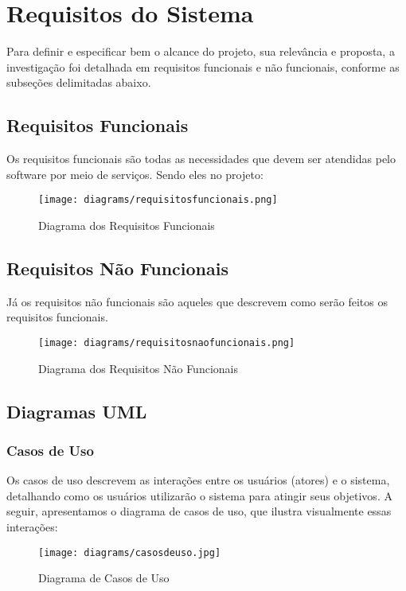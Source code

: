 \documentclass[../main.tex]{subfiles}
\begin{document}
\section{Requisitos do Sistema}
Para definir e especificar bem o alcance do projeto, sua relevância e proposta, a investigação foi detalhada em requisitos funcionais e não funcionais, conforme as subseções delimitadas abaixo. 
\subsection{Requisitos Funcionais}
Os requisitos funcionais são todas as necessidades que devem ser atendidas pelo software por meio de serviços. Sendo eles no projeto: 
\vspace{3cm}
\begin{figure}[htbp]
    \centering
    \texttt{[image: diagrams/requisitosfuncionais.png]}
    \caption{Diagrama dos Requisitos Funcionais}
    \label{fig:requisitos-funcionais}
\end{figure}
\subsection{Requisitos Não Funcionais}
Já os requisitos não funcionais são aqueles que descrevem como serão feitos os requisitos funcionais.
\vspace{3cm}
\begin{figure}[htbp]
    \centering
    \texttt{[image: diagrams/requisitosnaofuncionais.png]}
    \caption{Diagrama dos Requisitos Não Funcionais}
    \label{fig:requisitos-nao-funcionais}
\end{figure}
\newpage
\subsection{Diagramas UML}
\subsubsection{Casos de Uso}
Os casos de uso descrevem as interações entre os usuários (atores) e o sistema, detalhando como os usuários utilizarão o sistema para atingir seus objetivos. A seguir, apresentamos o diagrama de casos de uso, que ilustra visualmente essas interações:

\vspace{3cm}
\begin{figure}[htbp]
    \centering
    \texttt{[image: diagrams/casosdeuso.jpg]}
    \caption{Diagrama de Casos de Uso}
    \label{fig:casos-de-uso}
\end{figure}
\newpage
\end{document}
